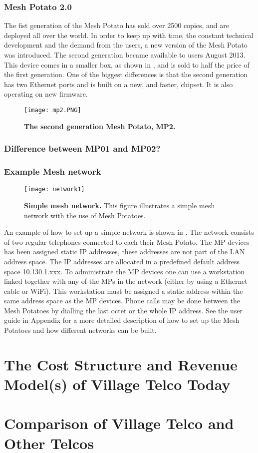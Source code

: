 \subsubsection{Mesh Potato 2.0}
The fist generation of the Mesh Potato has sold over 2500 copies, and are deployed all over the world. In order to keep up with time, the constant technical development and the demand from the users, a new version of the Mesh Potato was introduced. The second generation became available to users August 2013. This device comes in a smaller box, as shown in , and is sold to half the price of the first generation. One of the biggest differences is that the second generation has two Ethernet ports and is built on a new, and faster, chipset. It is also  operating on new firmware.

\begin{figure}[h!]
  \centering
      \texttt{[image: mp2.PNG]}
  \caption [MP2]{\textbf{The second generation Mesh Potato, MP2.}}
  \label{fig:MP02}
\end{figure}

\subsubsection{Difference between MP01 and MP02?}



\subsubsection{Example Mesh network}
\begin{figure}[b]
  \centering
      \texttt{[image: network1]}
  \caption [Example of a simple mesh network]{\textbf{Simple mesh network.} This figure illustrates a simple mesh network with the use of Mesh Potatoes.}
  \label{fig:network}
\end{figure}

An example of how to set up a simple network is shown in . The network consists of two regular telephones connected to each their Mesh Potato. The MP devices has been assigned static IP addresses, these addresses are not part of the LAN address space. The IP addresses are allocated in a predefined default address space 10.130.1.xxx. To administrate the MP devices one can use a workstation linked together with any of the MPs in the network (either by using a Ethernet cable or WiFi). This workstation must be assigned a static address within the same address space as the MP devices. Phone calls may be done between the Mesh Potatoes by dialling the last octet or the whole IP address. See the user guide in Appendix for a more detailed description of how to set up the Mesh Potatoes and how different networks can be built. 




\section{The Cost Structure and Revenue Model(s) of Village Telco Today}

\section{Comparison of Village Telco and Other Telcos}
